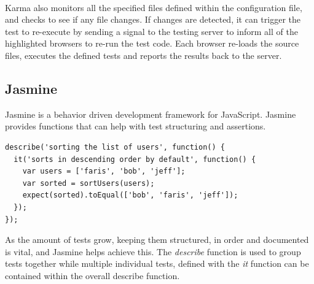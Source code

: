 \paragraph{}
Karma also monitors all the specified files defined within the configuration file, and checks to see if any file changes. If changes are detected, it can trigger the test to re-execute by sending a signal to the testing server to inform all of the highlighted browsers to re-run the test code. Each browser re-loads the source files, executes the defined tests and reports the results back to the server.

\subsection{Jasmine}
Jasmine is a behavior driven development framework for JavaScript. Jasmine provides functions that can help with test structuring and assertions. 

\begin{lstlisting}[caption=Test Definition with Jasmine]
describe('sorting the list of users', function() {
  it('sorts in descending order by default', function() {
    var users = ['faris', 'bob', 'jeff'];
    var sorted = sortUsers(users);
    expect(sorted).toEqual(['bob', 'faris', 'jeff']);
  });
});
\end{lstlisting}

As the amount of tests grow, keeping them structured, in order and documented is vital, and Jasmine helps achieve this. The \textit{describe} function is used to group tests together while multiple individual tests, defined with the \textit{it} function can be contained within the overall describe function.